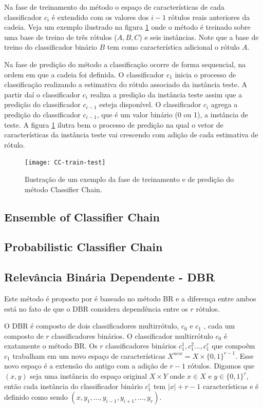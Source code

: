 Na fase de treinamento do método o espaço de características de cada classificador $c_i$ é 
extendido com os valores dos $i-1$ rótulos reais anteriores da cadeia. Veja um exemplo 
ilustrado na figura \ref{fig:CCtraintest} onde o método é treinado sobre uma base de treino de três rótulos ($A,B,C$)
e seis instâncias. Note que a base de treino do classificador binário $B$ tem como característica adicional o rótulo $A$.

Na fase de predição do método a classificação ocorre de forma sequencial, na ordem em que a cadeia foi definida.
O classificador $c_1$ inicia o processo de classificação realizando a estimativa do rótulo associado da instância teste.
A partir daí o classificador $c_i$ realiza a predição da instância teste assim que a predição do classificador $c_{i-1}$
esteja disponível. O classificador $c_i$ agrega a predição do classificador $c_{i-1}$, que é um valor binário (0 ou 1),
a instância de teste. A figura \ref{fig:CCtraintest} ilutra bem o processo de predição na qual o vetor de características da
instância teste vai crescendo com adição de cada estimativa de rótulo.


\begin{figure}

 \texttt{[image: CC-train-test]}
 \caption{Ilustração de um exemplo da fase de treinamento e de predição do método Classifier Chain.}
\label{fig:CCtraintest}
\end{figure}


\subsection{Ensemble of Classifier Chain}
\subsection{Probabilistic Classifier Chain}
\subsection{Relevância Binária Dependente - DBR}
\label{sec:dbr}
Este método é proposto por \cite{dbr2014} é baseado no método BR
e a diferença entre ambos está no fato de 
que o DBR considera dependência entre os $r$ rótulos.

O DBR é composto de dois classificadores multirrótulo, $c_0$ e $c_1$ , 
cada um composto de $r$ classificadores binários. O classificador multirrótulo $c_0$ é
exatamente o método BR. Os $r$ classificadores binários $c_1^1,c_1^2...,c_1^r$ que compoêm $c_1$ 
  trabalham em um novo espaço de características $X^{new}=X \times \{0,1\}^{r-1}$.
  Esse novo espaço é a extensão do antigo com a adição de $r-1$ rótulos.
  Digamos que $(x,y)$ seja uma instância do espaço original $X \times Y$
  onde $x \in X$ e $y \in {\{0,1\}}^{r}$, então cada instância
  do classificador binário $c_1^i$ tem $|x|+r-1$ características
  e é definido como sendo $(x,y_1,...,y_{i-1},y_{i+1},...,y_{r})$.
  
